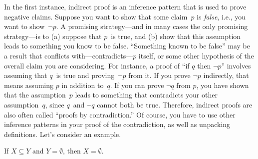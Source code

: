 \documentclass[../../../include/open-logic-section]{subfiles}
\begin{document}


In the first instance, indirect proof is an inference pattern that is
used to prove negative claims.  Suppose you want to show that some
claim~$p$ is \emph{false}, i.e., you want to show~$\lnot p$.  A
promising strategy---and in many cases the only promising
strategy---is to (a) suppose that $p$~is true, and (b) show that this
assumption leads to something you know to be false.  ``Something known
to be false'' may be a result that conflicts with---contradicts---$p$
itself, or some other hypothesis of the overall claim you are
considering.  For instance, a proof of ``if $q$ then $\lnot p$''
involves assuming that $q$~is true and proving~$\lnot p$ from it. If
you prove $\lnot p$ indirectly, that means assuming $p$ in addition
to~$q$. If you can prove $\lnot q$ from $p$, you have shown that the
assumption~$p$ leads to something that contradicts your other
assumption~$q$, since $q$~and $\lnot q$ cannot both be true.
Therefore, indirect proofs are also often called ``proofs by
contradiction.'' Of course, you have to use other inference patterns
in your proof of the contradiction, as well as unpacking definitions.
Let's consider an example.

\begin{prop}
  If $X \subseteq Y$ and $Y = \emptyset$, then $X = \emptyset$.
\end{prop}
\end{document}
